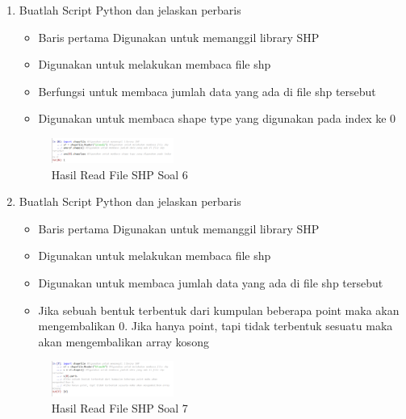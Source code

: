 \begin{enumerate}
    \item Buatlah Script Python dan jelaskan perbaris
    
    \hfill\break
    \begin{itemize}
        \item Baris pertama Digunakan untuk memanggil library SHP
        \item Digunakan untuk melakukan membaca file shp
        \item Berfungsi untuk membaca jumlah data yang ada di file shp tersebut
        \item Digunakan untuk membaca shape type yang digunakan pada index ke 0
    \end{itemize}
    \hfill\break
    \begin{figure}[H]
		\includegraphics[width=4cm]{figures/1174021/3/soal6.PNG}
		\centering
		\caption{Hasil Read File SHP Soal 6}
    \end{figure}

    \item Buatlah Script Python dan jelaskan perbaris
    
    \hfill\break
    \begin{itemize}
        \item Baris pertama Digunakan untuk memanggil library SHP
        \item Digunakan untuk melakukan membaca file shp
        \item Digunakan untuk membaca jumlah data yang ada di file shp tersebut
        \item Jika sebuah bentuk terbentuk dari kumpulan beberapa point maka akan mengembalikan 0. Jika hanya point, tapi tidak terbentuk sesuatu maka akan mengembalikan array kosong
    \end{itemize}
    \hfill\break
    \begin{figure}[H]
		\includegraphics[width=4cm]{figures/1174021/3/soal7.PNG}
		\centering
		\caption{Hasil Read File SHP Soal 7}
    \end{figure}


\end{enumerate}
